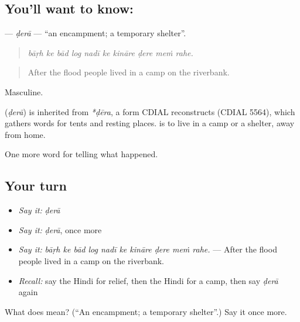 \subsection*{You'll want to know: }
\textbf{} — \emph{ḍerā} — \textquotedblleft{}an encampment; a temporary shelter\textquotedblright{}.

\begin{quote}
         
\end{quote}

\begin{quote}
\emph{bāṛh ke bād log nadī ke kināre ḍere meṁ rahe.}
\end{quote}

\begin{quote}
After the flood people lived in a camp on the riverbank.
\end{quote}

Masculine.

\begin{cousinweb}
\textbf{} (\emph{ḍerā}) is inherited from \emph{*ḍēra}, a form CDIAL reconstructs (CDIAL 5564), which gathers words for tents and resting places. \textbf{  } is to live in a camp or a shelter, away from home.
\end{cousinweb}

\begin{grammarlens}[title={What you've built}]
One more word for telling what happened.
\end{grammarlens}

\subsection*{Your turn}
\begin{itemize}
\raggedright
  \item \emph{Say it:} \emph{ḍerā}
  \item \emph{Say it:} \emph{ḍerā}, once more
  \item \emph{Say it:} \emph{bāṛh ke bād log nadī ke kināre ḍere meṁ rahe.} — After the flood people lived in a camp on the riverbank.
  \item \emph{Recall:} say the Hindi for relief, then the Hindi for a camp, then say \emph{ḍerā} again
\end{itemize}

\begin{tcolorbox}[breakable,colback=teal!4,colframe=teal!35!black,title={Before you move on}]
What does  mean? (\textquotedblleft{}An encampment; a temporary shelter\textquotedblright{}.) Say it once more.
\end{tcolorbox}
